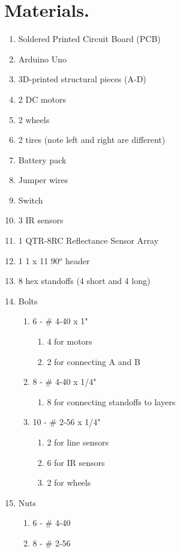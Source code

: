 \documentclass{handout}
\begin{document}
	\section{Materials.}
	\begin{enumerate}
		\item Soldered Printed Circuit Board (PCB)
		\item Arduino Uno
		\item 3D-printed structural pieces (A-D)
		\item 2 DC motors
		\item 2 wheels
		\item 2 tires (note left and right are different)
		\item Battery pack
		\item Jumper wires
		\item Switch
		\item 3 IR sensors
		\item 1 QTR-8RC Reflectance Sensor Array
		\item 1 1 x 11 90$^o$ header
		\item 8 hex standoffs (4 short and 4 long)
		\item Bolts
		\begin{enumerate}
			\item 6 - \# 4-40 x 1"
			\begin{enumerate}
				\item 4 for motors
				\item 2 for connecting A and B
			\end{enumerate}
			\item 8 - \# 4-40 x 1/4"
			\begin{enumerate}
				\item 8 for connecting standoffs to layers
			\end{enumerate}
			\item 10 - \# 2-56 x 1/4"
			\begin{enumerate}
				\item 2 for line sensors
				\item 6 for IR sensors
				\item 2 for wheels
			\end{enumerate}
		\end{enumerate}
		\item Nuts
		\begin{enumerate}
			\item 6 - \# 4-40
			\item 8 - \# 2-56
		\end{enumerate}
	\end{enumerate}
	\newpage
\clearpage
\pagebreak
	
\end{document}
